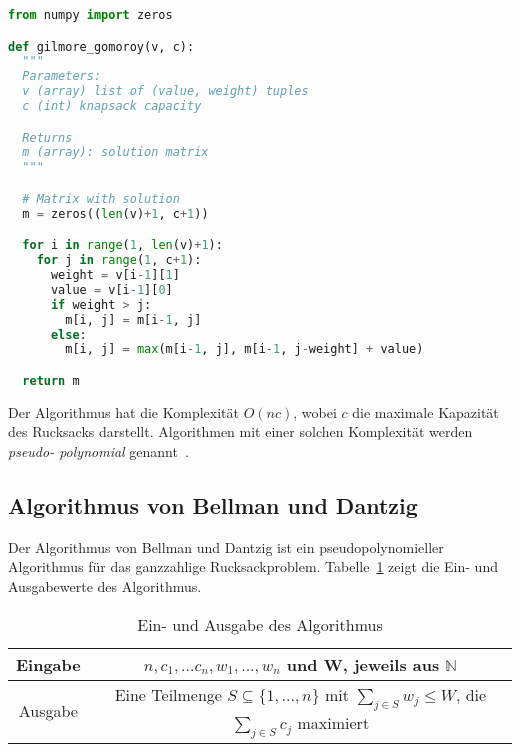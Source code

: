 \documentclass[12pt, a4paper, ngerman]{article}
\newcommand{\natnums}{\ensuremath{\mathbb{N}}}
\begin{document}
\begin{lstlisting}[language=Python,style=light,caption={Gilmore Gomoroy in Python}, label={lst:gg}]
from numpy import zeros

def gilmore_gomoroy(v, c):
  """
  Parameters: 
  v (array) list of (value, weight) tuples
  c (int) knapsack capacity

  Returns
  m (array): solution matrix
  """

  # Matrix with solution
  m = zeros((len(v)+1, c+1))

  for i in range(1, len(v)+1):
    for j in range(1, c+1):
      weight = v[i-1][1]
      value = v[i-1][0]
      if weight > j:
        m[i, j] = m[i-1, j]
      else:
        m[i, j] = max(m[i-1, j], m[i-1, j-weight] + value)

  return m
\end{lstlisting}

Der Algorithmus hat die Komplexität \(O(nc)\),
wobei \(c\) die maximale Kapazität des Rucksacks darstellt.
Algorithmen mit einer solchen Komplexität werden \emph{pseudo- polynomial} genannt~\cite{scheiterhauer2008}.

\subsection{Algorithmus von Bellman und Dantzig}
\FloatBarrier
Der Algorithmus von Bellman und Dantzig ist ein pseudopolynomieller Algorithmus für das ganzzahlige Rucksackproblem. Tabelle~\ref{BellmanDantzigIO} zeigt die Ein- und Ausgabewerte des Algorithmus.

\begin{table}
  \renewcommand{\arraystretch}{1.2}
  \centering
  \begin{tabular}{c|c}
    Eingabe & \(n, c_1,...c_n, w_1,...,w_n\) und W, jeweils aus \natnums \\
    \hline
    Ausgabe & Eine Teilmenge \(S \subseteq \{1,...,n\}\) mit \(\sum_{j\in S}w_j \leq W\), die \(\sum_{j \in S}c_j\) maximiert
  \end{tabular}
  \caption{Ein- und Ausgabe des Algorithmus}
  \label{BellmanDantzigIO}
\end{table}
\end{document}
